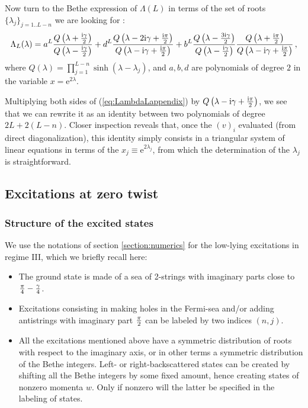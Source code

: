 \documentclass[11pt]{article}
\begin{document}
Now turn to the Bethe expression of $\Lambda(L)$ in terms of the set of roots $\{ \lambda_j\}_{j=1..L-n}$ we are looking for \cite{GM2}:
%
\begin{equation}
 \Lambda_L (\lambda)= a^L \frac{Q\left(\lambda+{ \mathrm{i}\gamma\over 2}\right)}{Q\left( \lambda-{ \mathrm{i}\gamma\over 2} \right)} 
 + d^L \frac{Q\left(\lambda-2\mathrm{i}\gamma+{ \mathrm{i}\pi\over 2}\right)}{Q\left(\lambda-\mathrm{i}\gamma+{ \mathrm{i}\pi\over 2} \right)} 
 + b^L  \frac{Q\left(\lambda-{3 \mathrm{i}\gamma\over 2}\right)}{Q\left( \lambda-{ \mathrm{i}\gamma\over 2} \right)} 
 \frac{Q\left(\lambda+{ \mathrm{i}\pi\over 2}\right)}{Q\left(\lambda-\mathrm{i}\gamma+{ \mathrm{i}\pi\over 2} \right)}  \,,
\label{eq:LambdaLappendix}
\end{equation}
%
where $Q(\lambda)=\prod_{j=1}^{L-n} \sinh(\lambda - \lambda_j)$, and $a , b, d$ are polynomials of degree $2$ in the variable $x= \mathrm{e}^{2\lambda}$.

Multiplying both sides of (\ref{eq:LambdaLappendix}) by $Q\left(\lambda-\mathrm{i}\gamma+{ \mathrm{i}\pi\over 2} \right)$, we see that we can rewrite it as an identity between two polynomials of degree $2L + 2(L-n)$. 
Closer inspection reveals that, once the $(v)_i$ evaluated (from direct diagonalization), this identity simply consists in a triangular system of linear equations in terms of the $x_j \equiv \mathrm{e}^{2 \lambda_j}$, from which the determination of the $\lambda_j$ is straightforward.

\subsection{Excitations at zero twist}
 
\subsubsection{Structure of the excited states} 
 
We use the notations of section \ref{section:numerics} for the low-lying excitations in regime III, which we briefly recall here:
%
\begin{itemize}
 \item The ground state is made of a sea of 2-strings with imaginary parts close to ${\pi \over 4} - {\gamma \over 4}$.
 \item Excitations consisting in making holes in the Fermi-sea and/or adding antistrings with imaginary part $\pi \over 2$ can be labeled by two indices $(n,j)$.
 \item All the excitations mentioned above have a symmetric distribution of roots with respect to the imaginary axis, or in other terms a symmetric distribution of the Bethe integers. Left- or right-backscattered states can be created by shifting all the Bethe integers by some fixed amount, hence creating states of nonzero momenta $w$. Only if nonzero will the latter be specified in the labeling of states. 
\end{itemize}
\end{document}
